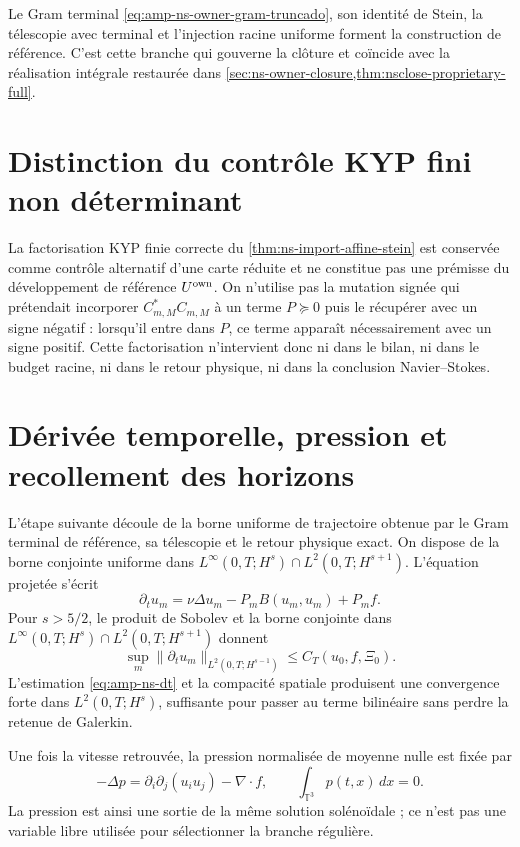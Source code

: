 Le Gram terminal \eqref{eq:amp-ns-owner-gram-truncado}, son identité de Stein, la télescopie avec terminal et l'injection racine uniforme forment la construction de référence. C'est cette branche qui gouverne la clôture et coïncide avec la réalisation intégrale restaurée dans \cref{sec:ns-owner-closure,thm:nsclose-proprietary-full}.

\section*{Distinction du contrôle KYP fini non déterminant}

La factorisation KYP finie correcte du \cref{thm:ns-import-affine-stein} est conservée comme contrôle alternatif d'une carte réduite et ne constitue pas une prémisse du développement de référence \(U^{\rm own}\). On n'utilise pas la mutation signée qui prétendait incorporer \(C_{m,M}^*C_{m,M}\) à un terme \(P\succeq0\) puis le récupérer avec un signe négatif : lorsqu'il entre dans \(P\), ce terme apparaît nécessairement avec un signe positif. Cette factorisation n'intervient donc ni dans le bilan, ni dans le budget racine, ni dans le retour physique, ni dans la conclusion Navier--Stokes.

\section*{Dérivée temporelle, pression et recollement des horizons}

L'étape suivante découle de la borne uniforme de trajectoire obtenue par le Gram terminal de référence, sa télescopie et le retour physique exact. On dispose de la borne conjointe uniforme dans \(L^\infty(0,T;H^s)\cap L^2(0,T;H^{s+1})\). L'équation projetée s'écrit
\begin{equation}\label{eq:amp-ns-proyectada}
 \partial_tu_m
 =\nu\Delta u_m-P_mB(u_m,u_m)+P_mf.
\end{equation}
Pour \(s>5/2\), le produit de Sobolev et la borne conjointe dans \(L^\infty(0,T;H^s)\cap L^2(0,T;H^{s+1})\) donnent
\begin{equation}\label{eq:amp-ns-dt}
 \sup_m\|\partial_tu_m\|_{L^2(0,T;H^{s-1})}
 \leq C_T(u_0,f,\Xi_0).
\end{equation}
L'estimation \eqref{eq:amp-ns-dt} et la compacité spatiale produisent une convergence forte dans \(L^2(0,T;H^s)\), suffisante pour passer au terme bilinéaire sans perdre la retenue de Galerkin.

Une fois la vitesse retrouvée, la pression normalisée de moyenne nulle est fixée par
\begin{equation}\label{eq:amp-ns-presion}
 -\Delta p
 =\partial_i\partial_j(u_i u_j)-\nabla\!\cdot f,
 \qquad \int_{\mathbb T^3}p(t,x)\,dx=0.
\end{equation}
La pression est ainsi une sortie de la même solution solénoïdale ; ce n'est pas une variable libre utilisée pour sélectionner la branche régulière.

